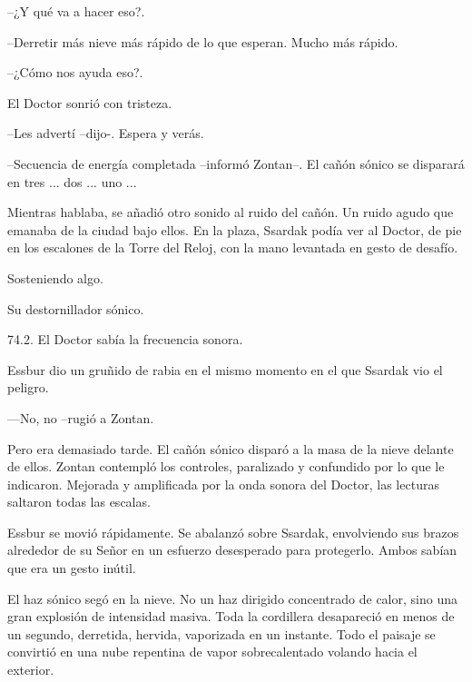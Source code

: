 --¿Y qué va a hacer eso?.



--Derretir más nieve más rápido de lo que esperan. Mucho más rápido.



--¿Cómo nos ayuda eso?.



El Doctor sonrió con tristeza.


--Les advertí --dijo-. Espera y verás.



\mbox{}



--Secuencia de energía completada --informó Zontan--. El cañón sónico se disparará en tres ... dos ... uno ...



Mientras hablaba, se añadió otro sonido al ruido del cañón. Un ruido agudo que emanaba de la ciudad bajo ellos. En la plaza, Ssardak podía ver al Doctor, de pie en los escalones de la Torre del Reloj, con la mano levantada en gesto de desafío.



Sosteniendo algo.



Su destornillador sónico.



74.2. El Doctor sabía la frecuencia sonora.



Essbur dio un gruñido de rabia en el mismo momento en el que Ssardak vio el peligro.



—No, no --rugió a Zontan.



Pero era demasiado tarde. El cañón sónico disparó a la masa de la nieve delante de ellos. Zontan contempló los controles, paralizado y confundido por lo que le indicaron. Mejorada y amplificada por la onda sonora del Doctor, las lecturas saltaron todas las escalas.



Essbur se movió rápidamente. Se abalanzó sobre Ssardak, envolviendo sus brazos alrededor de su Señor en un esfuerzo desesperado para protegerlo. Ambos sabían que era un gesto inútil.



El haz sónico segó en la nieve. No un haz dirigido concentrado de calor, sino una gran explosión de intensidad masiva. Toda la cordillera desapareció en menos de un segundo, derretida, hervida, vaporizada en un instante. Todo el paisaje se convirtió en una nube repentina de vapor sobrecalentado volando hacia el exterior.



